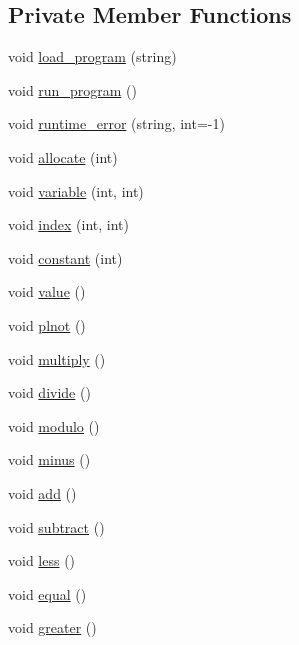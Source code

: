 \subsection*{Private Member Functions}
\begin{DoxyCompactItemize}
\item 
void \hyperlink{classInterpreter_ad88b100c53bbf05172daafcfaabf77a6}{load\_\-program} (string)
\item 
void \hyperlink{classInterpreter_a471d0958d94f1378dfbc83d378a604a1}{run\_\-program} ()
\item 
void \hyperlink{classInterpreter_ac5ae8c07a18fbec811b37e2dd500c3ef}{runtime\_\-error} (string, int=-\/1)
\item 
void \hyperlink{classInterpreter_ad52aec1a3af5198ba353ddcdc4dacaed}{allocate} (int)
\item 
void \hyperlink{classInterpreter_ac9e99e8d7aa00928ed590354231a84fc}{variable} (int, int)
\item 
void \hyperlink{classInterpreter_aad0bc05e209d533b2771798cea86d21a}{index} (int, int)
\item 
void \hyperlink{classInterpreter_a88892bf93230336ef0ea0c2a218e5af6}{constant} (int)
\item 
void \hyperlink{classInterpreter_a9dd8f6e72262517ab78d956360868dbc}{value} ()
\item 
void \hyperlink{classInterpreter_a74d15a1c501fbe26b66e4d44a86a57eb}{plnot} ()
\item 
void \hyperlink{classInterpreter_a030165f73b064a2e22216b8dbb659259}{multiply} ()
\item 
void \hyperlink{classInterpreter_a08c1dbed7667664b45c26142cc90b9c7}{divide} ()
\item 
void \hyperlink{classInterpreter_a88b9baaecb6f18e2266b54be7f5f6817}{modulo} ()
\item 
void \hyperlink{classInterpreter_ab5d74f8dc5770eb8f6869f30401e4a69}{minus} ()
\item 
void \hyperlink{classInterpreter_aa890b84392084c5cd2c2586dc2a3a7a8}{add} ()
\item 
void \hyperlink{classInterpreter_aa535362cdd6da9d9f4184e180d8c7f56}{subtract} ()
\item 
void \hyperlink{classInterpreter_a58ba8620d123934102e6c35fff1392f0}{less} ()
\item 
void \hyperlink{classInterpreter_a129c1560de1856427446a8da8ceb80ca}{equal} ()
\item 
void \hyperlink{classInterpreter_ad12692ddcafda749510418bb6d6c58df}{greater} ()

\end{DoxyCompactItemize}
